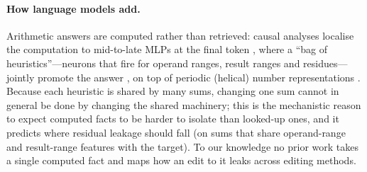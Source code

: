 \paragraph{How language models add.}
Arithmetic answers are computed rather than retrieved: causal analyses localise the computation to mid-to-late MLPs at the final token \citep{stolfo2023arithmetic,zhang2024arith}, where a ``bag of heuristics''---neurons that fire for operand ranges, result ranges and residues---jointly promote the answer \citep{nikankin2024heuristics}, on top of periodic (helical) number representations \citep{kantamneni2025trig}. Because each heuristic is shared by many sums, changing one sum cannot in general be done by changing the shared machinery; this is the mechanistic reason to expect computed facts to be harder to isolate than looked-up ones, and it predicts where residual leakage should fall (on sums that share operand-range and result-range features with the target). To our knowledge no prior work takes a single computed fact and maps how an edit to it leaks across editing methods.
